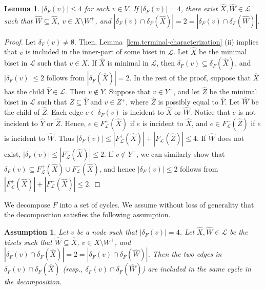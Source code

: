 \documentclass{article}
\newtheorem{lemma}{Lemma}
\newtheorem{assumption}{Assumption}
\newcommand{\Lfam}{\mathcal{L}}
\begin{document}
\begin{lemma}
 $|\delta_F(v)| \leq 4$ for each $v \in V$.
 If $|\delta_F(v)| = 4$, there exist $\hat{X},\hat{W} \in \Lfam$
 such that $\hat{W} \subseteq \hat{X}$, $v \in X \setminus W^+$,
 and $|\delta_F(v)\cap \delta_F(\hat{X})|=2=|\delta_F(v)\cap \delta_F(\hat{W})|$.
\end{lemma}
\begin{proof}
 Let $\delta_F(v) \neq \emptyset$. Then,
 Lemma~\ref{lem.terminal-characterization} (ii) implies that
 $v$ is included in the inner-part of some biset in $\Lfam$.
 Let $\hat{X}$ be the minimal biset in $\Lfam$ such that $v \in X$.
 If $\hat{X}$ is minimal in $\Lfam$,
 then $\delta_F(v) \subseteq \delta_F(\hat{X})$, and
 $|\delta_F(v)|\leq 2$ follows from $|\delta_F(\hat{X})|= 2$.
 In the rest of the proof, suppose that
 $\hat{X}$  has the child $\hat{Y} \in \Lfam$.
 Then $v \not\in Y$.
 Suppose that $v \in Y^+$, and let $\hat{Z}$ be the minimal biset in
 $\Lfam$
 such that $\hat{Z} \subseteq \hat{Y}$ and $v \in Z^+$,
 where $\hat{Z}$ is
 possibly equal to $\hat{Y}$.
 Let $\hat{W}$ be the child of $\hat{Z}$.
 Each edge  $e \in \delta_F(v)$ is incident to $\hat{X}$ or $\hat{W}$.
 Notice that $e$ is not incident to $\hat{Y}$ or $\hat{Z}$.
 Hence,
 $e \in F^+_{\Lfam}(\hat{X})$ if $e$ is incident to $\hat{X}$, 
 and $e \in F^-_{\Lfam}(\hat{Z})$ if $e$ is incident to $\hat{W}$.
 Thus $|\delta_F(v)| \leq |F^+_{\Lfam}(\hat{X})| + |F^-_{\Lfam}(\hat{Z})| \leq 4$.
 If $\hat{W}$ does not exist,
 $|\delta_F(v)| \leq |F^+_{\Lfam}(\hat{X})| \leq 2$.
 If $v \not\in Y^+$, we can similarly show that $\delta_F(v) \subseteq
 F^+_{\Lfam}(\hat{X}) \cup F^-_{\Lfam}(\hat{X})$, and hence
 $|\delta_F(v)| \leq 2$ follows from
 $|F^+_{\Lfam}(\hat{X})| + |F^-_{\Lfam}(\hat{X})|\leq 2$.
\end{proof}

We decompose $F$ into a set of cycles.
We assume without loss of generality that the decomposition satisfies
the following assumption.

 \begin{assumption}
  \label{assump.cycle}
 Let $v$ be a node such that $|\delta_F(v)|=4$. Let $\hat{X},\hat{W} \in
 \Lfam$ be the bisets such that $\hat{W} \subseteq \hat{X}$, $v \in X
  \setminus W^+$, and
 $|\delta_F(v)\cap \delta_F(\hat{X})|=2=|\delta_F(v)\cap
  \delta_F(\hat{W})|$.
  Then the two edges in $\delta_F(v)\cap \delta_F(\hat{X})$
  {\rm (}resp., $\delta_F(v)\cap \delta_F(\hat{W})${\rm )}
  are included in the same cycle in the decomposition.
   \end{assumption}
\end{document}
